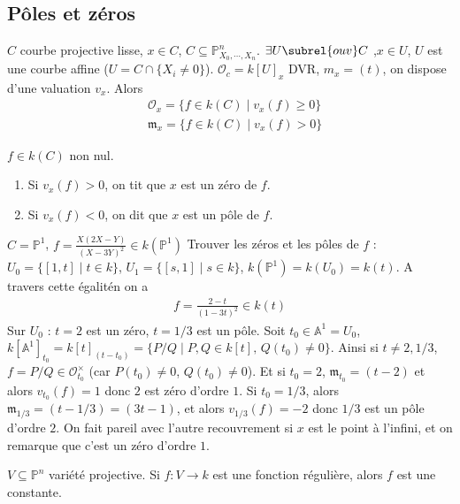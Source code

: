         \subsection{Pôles et zéros}
            $C$ courbe projective lisse, $x \in C$, $C \subseteq \mathbb{P}^n_{X_0, \cdots, X_n}$. $\exists U \subrel{ouv} C$ ,$x \in U$, $U$ est une courbe affine ($U = C \cap \{X_i \neq 0\}$). $\mathcal{O}_c = k[U]_x$ DVR, $m_x = (t)$, on dispose d'une valuation $v_x$. Alors
            \begin{align*}
                & \mathcal{O}_x = \{f \in k(C) \mid v_x(f) \geq 0\} \\
                & \mathfrak{m}_x = \{f \in k(C) \mid v_x(f) > 0\}
            \end{align*}
            \begin{defi}
                $f \in k(C)$ non nul.
                \begin{enumerate}
                    \item Si $v_x(f) > 0$, on tit que $x$ est un zéro de $f$.
                    \item Si $v_x(f) < 0$, on dit que $x$ est un pôle de $f$. 
                \end{enumerate}
            \end{defi}
            \begin{expl}
                $C = \mathbb{P}^1$, $f = \frac{X(2X - Y)}{(X - 3Y)^2} \in k(\mathbb{P}^1)$ Trouver les zéros et les pôles de $f$ : $U_0 = \{[1,t] \mid t \in k\}$, $U_1 = \{[s,1] \mid s \in k\}$, $k(\mathbb{P}^1) = k(U_0) = k(t)$. A travers cette égalitén on a
                \begin{align*}
                    f = \frac{2 - t}{(1 - 3t)^2} \in k(t)
                \end{align*}
                Sur $U_0$ : $t = 2$ est un zéro, $t = 1/3$ est un pôle. Soit $t_0 \in \mathbb{A}^1 = U_0$, $k[\mathbb{A}^1]_{t_0} = k[t]_{(t - t_0)} = \{P/Q \mid P,Q \in k[t],\, Q(t_0) \neq 0\}$. Ainsi si $t \neq 2,1/3$, $f = P/Q \in \mathcal{O}^\times_{t_0}$ (car $P(t_0) \neq 0$, $Q(t_0) \neq 0$). Et si $t_0 = 2$, $\mathfrak{m}_{t_0} = (t - 2)$ et alors $v_{t_0}(f) = 1$ donc $2$ est zéro d'ordre $1$. Si $t_0 = 1/3$, alors $\mathfrak{m}_{1/3} = (t - 1/3) = (3t - 1)$, et alors $v_{1/3}(f) = -2$ donc $1/3$ est un pôle d'ordre $2$.
                On fait pareil avec l'autre recouvrement si $x$ est le point à l'infini, et on remarque que c'est un zéro d'ordre $1$. 
            \end{expl}
            \begin{theo}
                $V \subseteq \mathbb{P}^n$ variété projective. Si $f : V \to k$ est une fonction régulière, alors $f$ est une constante. 
            \end{theo}
